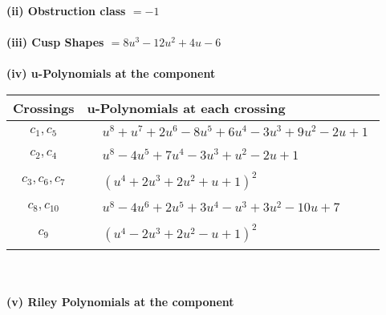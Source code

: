 \documentclass[1p]{elsarticle_modified}
\theoremstyle{definition}
\begin{document}
\flushleft \textbf{(ii) Obstruction class $= -1$}\\~\\
\flushleft \textbf{(iii) Cusp Shapes $= 8 u^3-12 u^2+4 u-6$}\\~\\
\newpage\renewcommand{\arraystretch}{1}
\flushleft \textbf{(iv) u-Polynomials at the component}\newline \\
\begin{tabular}{m{50pt}|m{274pt}}
Crossings & \hspace{64pt}u-Polynomials at each crossing \\
\hline $$\begin{aligned}c_{1},c_{5}\end{aligned}$$&$\begin{aligned}
&u^8+u^7+2 u^6-8 u^5+6 u^4-3 u^3+9 u^2-2 u+1
\end{aligned}$\\
\hline $$\begin{aligned}c_{2},c_{4}\end{aligned}$$&$\begin{aligned}
&u^8-4 u^5+7 u^4-3 u^3+u^2-2 u+1
\end{aligned}$\\
\hline $$\begin{aligned}c_{3},c_{6},c_{7}\end{aligned}$$&$\begin{aligned}
&(u^4+2 u^3+2 u^2+u+1)^2
\end{aligned}$\\
\hline $$\begin{aligned}c_{8},c_{10}\end{aligned}$$&$\begin{aligned}
&u^8-4 u^6+2 u^5+3 u^4- u^3+3 u^2-10 u+7
\end{aligned}$\\
\hline $$\begin{aligned}c_{9}\end{aligned}$$&$\begin{aligned}
&(u^4-2 u^3+2 u^2- u+1)^2
\end{aligned}$\\
\hline
\end{tabular}\\~\\
\newpage\renewcommand{\arraystretch}{1}
\flushleft \textbf{(v) Riley Polynomials at the component}\newline \\
\end{document}
